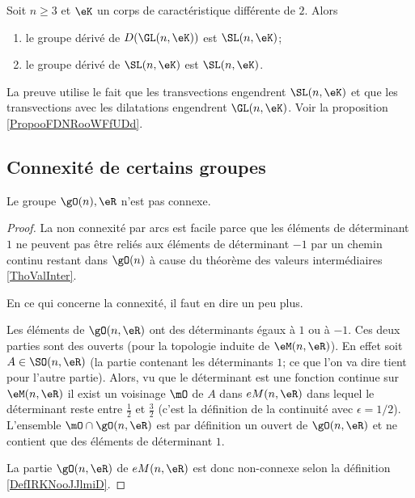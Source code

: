 \begin{proposition}
    Soit \( n\geq 3\) et \( \eK\) un corps de caractéristique différente de \( 2\). Alors
    \begin{enumerate}
        \item
            le groupe dérivé de \( D(\GL(n,\eK))\) est \(\SL(n,\eK)\);  
        \item
            le groupe dérivé de \( \SL(n,\eK)\) est \( \SL(n,\eK)\).
    \end{enumerate}
\end{proposition}
La preuve utilise le fait que les transvections engendrent \( \SL(n,\eK)\) et que les transvections avec les dilatations engendrent \( \GL(n,\eK)\). Voir la proposition \ref{PropooFDNRooWFfUDd}.

\subsection{Connexité  de certains groupes}


\begin{lemma}           \label{LEMooIPOVooZJyNoH}
    Le groupe \( \gO(n),\eR\) n'est pas connexe.
\end{lemma}

\begin{proof}
    La non connexité par arcs est facile parce que les éléments de déterminant \( 1\) ne peuvent pas être reliés aux éléments de déterminant \( -1\) par un chemin continu restant dans \( \gO(n)\) à cause du théorème des valeurs intermédiaires \ref{ThoValInter}.

    En ce qui concerne la connexité, il faut en dire un peu plus.

    Les éléments de \( \gO(n,\eR)\) ont des déterminants égaux à \( 1\) ou à \( -1\). Ces deux parties sont des ouverts (pour la topologie induite de \( \eM(n,\eR)\)). En effet soit \( A\in\SO(n,\eR)\) (la partie contenant les déterminants \( 1\); ce que l'on va dire tient pour l'autre partie). Alors, vu que le déterminant est une fonction continue sur \( \eM(n,\eR)\) il exist un voisinage \( \mO\) de \( A\) dans \( \\eM(n,\eR)\) dans lequel le déterminant reste entre \( \frac{ 1 }{2}\) et \( \frac{ 3 }{2}\) (c'est la définition de la continuité avec \( \epsilon=1/2\)). L'ensemble \( \mO\cap\gO(n,\eR)\) est par définition un ouvert de \( \gO(n,\eR)\) et ne contient que des éléments de déterminant \( 1\).

    La partie \( \gO(n,\eR)\) de \( \\eM(n,\eR)\) est donc non-connexe selon la définition \ref{DefIRKNooJJlmiD}.
\end{proof}

